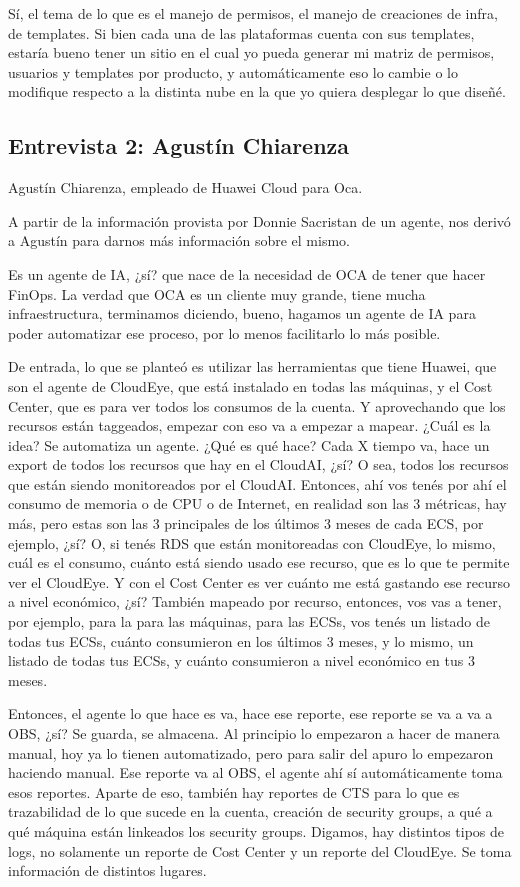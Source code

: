 Sí, el tema de lo que es el manejo de permisos, el manejo de creaciones de infra, de templates. Si bien cada una de las plataformas cuenta con sus templates, estaría bueno tener un sitio en el cual yo pueda generar mi matriz de permisos, usuarios y templates por producto, y automáticamente eso lo cambie o lo modifique respecto a la distinta nube en la que yo quiera desplegar lo que diseñé.

\subsection{Entrevista 2: Agustín Chiarenza}

Agustín Chiarenza, empleado de Huawei Cloud para Oca.

A partir de la información provista por Donnie Sacristan de un agente, nos derivó a Agustín para darnos más información sobre el mismo.

Es un agente de IA, ¿sí? que nace de la necesidad de OCA de tener que hacer FinOps. La verdad que OCA es un cliente muy grande, tiene mucha infraestructura, terminamos diciendo, bueno, hagamos un agente de IA para poder automatizar ese proceso, por lo menos facilitarlo lo más posible.

De entrada, lo que se planteó es utilizar las herramientas que tiene Huawei, que son el agente de CloudEye, que está instalado en todas las máquinas, y el Cost Center, que es para ver todos los consumos de la cuenta. Y aprovechando que los recursos están taggeados, empezar con eso va a empezar a mapear. ¿Cuál es la idea? Se automatiza un agente. ¿Qué es qué hace? Cada X tiempo va, hace un export de todos los recursos que hay en el CloudAI, ¿sí? O sea, todos los recursos que están siendo monitoreados por el CloudAI. Entonces, ahí vos tenés por ahí el consumo de memoria o de CPU o de Internet, en realidad son las 3 métricas, hay más, pero estas son las 3 principales de los últimos 3 meses de cada ECS, por ejemplo, ¿sí? O, si tenés RDS que están monitoreadas con CloudEye, lo mismo, cuál es el consumo, cuánto está siendo usado ese recurso, que es lo que te permite ver el CloudEye. Y con el Cost Center es ver cuánto me está gastando ese recurso a nivel económico, ¿sí? También mapeado por recurso, entonces, vos vas a tener, por ejemplo, para la para las máquinas, para las ECSs, vos tenés un listado de todas tus ECSs, cuánto consumieron en los últimos 3 meses, y lo mismo, un listado de todas tus ECSs, y cuánto consumieron a nivel económico en tus 3 meses.

Entonces, el agente lo que hace es va, hace ese reporte, ese reporte se va a va a OBS, ¿sí? Se guarda, se almacena. Al principio lo empezaron a hacer de manera manual, hoy ya lo tienen automatizado, pero para salir del apuro lo empezaron haciendo manual. Ese reporte va al OBS, el agente ahí sí automáticamente toma esos reportes. Aparte de eso, también hay reportes de CTS para lo que es trazabilidad de lo que sucede en la cuenta, creación de security groups, a qué a qué máquina están linkeados los security groups. Digamos, hay distintos tipos de logs, no solamente un reporte de Cost Center y un reporte del CloudEye. Se toma información de distintos lugares.

